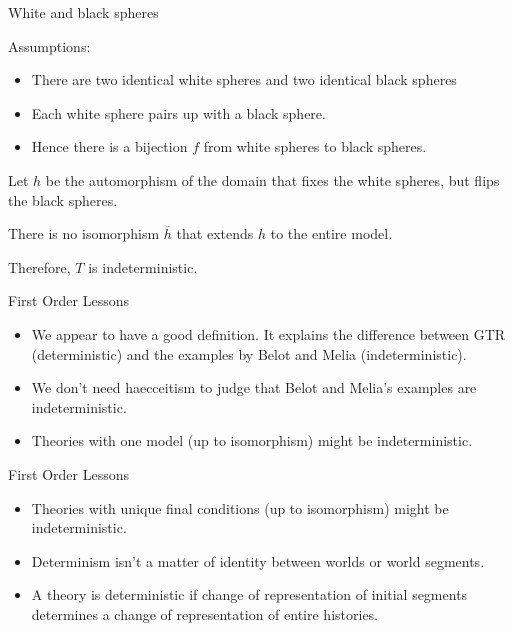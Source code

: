 \documentclass[fleqn]{beamer}
\begin{document}
\begin{frame}{White and black spheres}

  Assumptions:
  \begin{itemize}
  \item There are two identical white spheres and two identical black
    spheres
  \item Each white sphere pairs up with a black sphere.
  \item Hence there is a bijection $f$ from white spheres to black
    spheres.
  \end{itemize}

  \hrulefill

  Let $h$ be the automorphism of the domain that fixes the white
  spheres, but flips the black spheres.

  There is no isomorphism $\overline{h}$ that extends $h$ to the
  entire model.

  Therefore, $T$ is indeterministic.

\end{frame}

\begin{frame}{First Order Lessons}

  \begin{itemize}
  \item We appear to have a good definition. It explains the
    difference between GTR (deterministic) and the examples by Belot
    and Melia (indeterministic).
  \item We don't need haecceitism to judge that Belot and Melia's
    examples are indeterministic.
  \item Theories with one model (up to isomorphism) might be
    indeterministic.
  \end{itemize}
\end{frame}

\begin{frame}{First Order Lessons}

  \begin{itemize}  

  \item Theories with unique final conditions (up to isomorphism)
    might be indeterministic. 
  \item Determinism isn't a matter of identity between worlds or world
    segments.
  \item A theory is deterministic if change of representation of
    initial segments determines a change of representation of entire
    histories.
  \end{itemize}

\end{frame}
\end{document}

